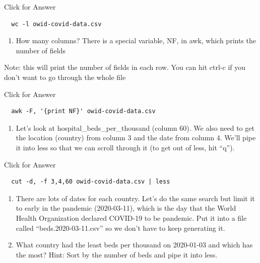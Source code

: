 \documentclass[
]{book}
\providecommand{\tightlist}{%
  \setlength{\itemsep}{0pt}\setlength{\parskip}{0pt}}
\begin{document}
Click for Answer

\begin{verbatim}
  wc -l owid-covid-data.csv
\end{verbatim}

\hfill\break

\begin{enumerate}
\def\labelenumi{\arabic{enumi}.}
\setcounter{enumi}{12}
\tightlist
\item
  How many columns? There is a special variable, NF, in awk, which prints the number of fields
\end{enumerate}

Note: this will print the number of fields in each row. You can hit ctrl-c if you don't want to go through the whole file

Click for Answer

\begin{verbatim}
  awk -F, '{print NF}' owid-covid-data.csv
\end{verbatim}

\hfill\break

\begin{enumerate}
\def\labelenumi{\arabic{enumi}.}
\setcounter{enumi}{13}
\tightlist
\item
  Let's look at hospital\_beds\_per\_thousand (column 60). We also need to get the location (country) from column 3 and the date from column 4. We'll pipe it into less so that we can scroll through it (to get out of less, hit ``q'').
\end{enumerate}

Click for Answer

\begin{verbatim}
  cut -d, -f 3,4,60 owid-covid-data.csv | less
\end{verbatim}

\hfill\break

\begin{enumerate}
\def\labelenumi{\arabic{enumi}.}
\setcounter{enumi}{14}
\item
  There are lots of dates for each country. Let's do the same search but limit it to early in the pandemic (2020-03-11), which is the day that the World Health Organization declared COVID-19 to be pandemic. Put it into a file called ``beds.2020-03-11.csv'' so we don't have to keep generating it.
\item
  What country had the least beds per thousand on 2020-01-03 and which has the most? Hint: Sort by the number of beds and pipe it into less.
\end{enumerate}
\end{document}
